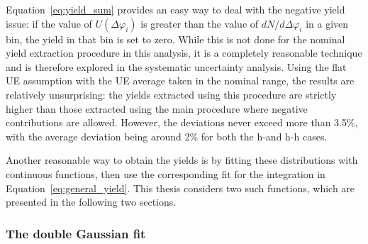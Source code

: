 Equation~\ref{eq:yield_sum} provides an easy way to deal with the negative yield issue: if the value of $U(\Delta\varphi_{i})$ is greater than the value of $dN/d\Delta\varphi_{i}$ in a given bin, the yield in that bin is set to zero. While this is not done for the nominal yield extraction procedure in this analysis, it is a completely reasonable technique and is therefore explored in the systematic uncertainty analysis. Using the flat UE assumption with the UE average taken in the nominal range, the results are relatively unsurprising: the yields extracted using this procedure are strictly higher than those extracted using the main procedure where negative contributions are allowed. However, the deviations never exceed more than 3.5\%, with the average deviation being around 2\% for both the h-\lmb and h-h cases.

Another reasonable way to obtain the yields is by fitting these distributions with continuous functions, then use the corresponding fit for the integration in Equation~\ref{eq:general_yield}. This thesis considers two such functions, which are presented in the following two sections.

\subsubsection{The double Gaussian fit}
\label{sec:double_gaus_fit}

